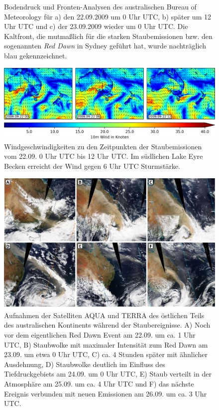 \documentclass[12pt,a4paper,onecolumn,headheight=30pt]{scrartcl}
\begin{document}
\begin{figure}[htbp]
\begin{minipage}[c]{0.33\textwidth}
	\end{minipage}\hfill
	\caption{Bodendruck und Fronten-Analysen des australischen Bureau of Meteorology für a) den 22.09.2009 um 0 Uhr UTC, b) später um 12 Uhr UTC und c) der 23.09.2009 wieder um 0 Uhr UTC. Die Kaltfront, die mutmaßlich für die starken Staubemissionen bzw. den sogenannten \textit{Red Dawn} in Sydney geführt hat, wurde nachträglich blau gekennzeichnet.} \label{fig:bom_analysis}
\end{figure}
\begin{figure}[htbp]
\includegraphics[width=\textwidth]{bilder/reddawn/wind_reddawn_small.png}
\caption{Windgeschwindigkeiten zu den Zeitpunkten der Staubemissionen vom 22.09. 0 Uhr UTC bis 12 Uhr UTC. Im südlichen Lake Eyre Becken erreicht der Wind gegen 6 Uhr UTC Sturmstärke.} \label{fig:wind_reddawn}
\end{figure}
\begin{figure}[htbp]
\includegraphics[width=\textwidth]{bilder/reddawn/reddawn_satellite.pdf}
\caption{Aufnahmen der Satelliten AQUA und TERRA des östlichen Teils des australischen Kontinents während der Staubereignisse. A) Noch vor dem eigentlichen Red Dawn Event am 22.09. um ca. 1 Uhr UTC, B) Staubwolke mit maximaler Intensität zum Red Dawn am 23.09. um etwa 0 Uhr UTC, C) ca. 4 Stunden später mit ähnlicher Ausdehnung, D) Staubwolke deutlich im Einfluss des Tiefdruckgebiets am 24.09. um 0 Uhr UTC, E) Staub verteilt in der Atmosphäre am 25.09. um ca. 4 Uhr UTC und F) das nächste Ereignis verbunden mit neuen Emissionen am 26.09. um ca. 3 Uhr UTC.} \label{fig:satellite}
\end{figure}
\end{document}
